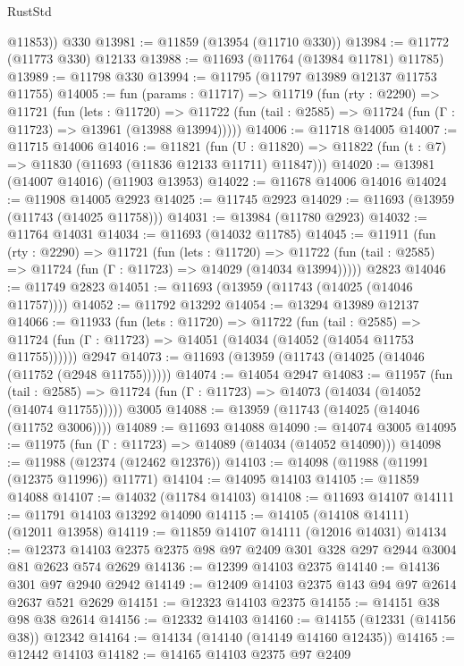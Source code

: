 \begin{lexlean}{RustStd}
\begin{coremodule}
        @11853))
    @330
@13981 := @11859 (@13954 (@11710 @330))
@13984 := @11772 (@11773 @330) @12133
@13988 := @11693 (@11764 (@13984 @11781) @11785)
@13989 := @11798 @330
@13994 := @11795 (@11797 @13989 @12137 @11753 @11755)
@14005 := fun (params : @11717) =>
  @11719
    (fun (rty : @2290) =>
    @11721
      (fun (lets : @11720) =>
      @11722 (fun (tail : @2585) => @11724 (fun (Γ : @11723) => @13961 (@13988 @13994)))))
@14006 := @11718 @14005
@14007 := @11715 @14006
@14016 := @11821
    (fun (U : @11820) => @11822 (fun (t : @7) => @11830 (@11693 (@11836 @12133 @11711) @11847)))
@14020 := @13981 (@14007 @14016) (@11903 @13953)
@14022 := @11678 @14006 @14016
@14024 := @11908 @14005 @2923
@14025 := @11745 @2923
@14029 := @11693 (@13959 (@11743 (@14025 @11758)))
@14031 := @13984 (@11780 @2923)
@14032 := @11764 @14031
@14034 := @11693 (@14032 @11785)
@14045 := @11911
    (fun (rty : @2290) =>
    @11721
      (fun (lets : @11720) =>
      @11722 (fun (tail : @2585) => @11724 (fun (Γ : @11723) => @14029 (@14034 @13994)))))
    @2823
@14046 := @11749 @2823
@14051 := @11693 (@13959 (@11743 (@14025 (@14046 @11757))))
@14052 := @11792 @13292
@14054 := @13294 @13989 @12137
@14066 := @11933
    (fun (lets : @11720) =>
    @11722
      (fun (tail : @2585) =>
      @11724 (fun (Γ : @11723) => @14051 (@14034 (@14052 (@14054 @11753 @11755))))))
    @2947
@14073 := @11693 (@13959 (@11743 (@14025 (@14046 (@11752 (@2948 @11755))))))
@14074 := @14054 @2947
@14083 := @11957
    (fun (tail : @2585) => @11724 (fun (Γ : @11723) => @14073 (@14034 (@14052 (@14074 @11755)))))
    @3005
@14088 := @13959 (@11743 (@14025 (@14046 (@11752 @3006))))
@14089 := @11693 @14088
@14090 := @14074 @3005
@14095 := @11975 (fun (Γ : @11723) => @14089 (@14034 (@14052 @14090)))
@14098 := @11988 (@12374 (@12462 @12376))
@14103 := @14098 (@11988 (@11991 (@12375 @11996)) @11771)
@14104 := @14095 @14103
@14105 := @11859 @14088
@14107 := @14032 (@11784 @14103)
@14108 := @11693 @14107
@14111 := @11791 @14103 @13292 @14090
@14115 := @14105 (@14108 @14111) (@12011 @13958)
@14119 := @11859 @14107 @14111 (@12016 @14031)
@14134 := @12373 @14103 @2375 @2375 @98 @97 @2409 @301 @328 @297 @2944 @3004 @81 @2623 @574 @2629
@14136 := @12399 @14103 @2375
@14140 := @14136 @301 @97 @2940 @2942
@14149 := @12409 @14103 @2375 @143 @94 @97 @2614 @2637 @521 @2629
@14151 := @12323 @14103 @2375
@14155 := @14151 @38 @98 @38 @2614
@14156 := @12332 @14103
@14160 := @14155 (@12331 (@14156 @38)) @12342
@14164 := @14134 (@14140 (@14149 @14160 @12435))
@14165 := @12442 @14103
@14182 := @14165
    @14103
    @2375
    @97
    @2409

\end{coremodule}
\end{lexlean}
